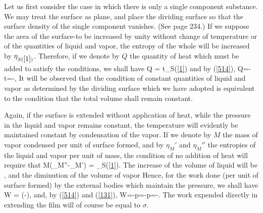 \documentclass[12pt]{article}
\begin{document}
{Let us first consider the case in which there is only a single component substance.  We may treat the surface as plane, and place the dividing surface so that the surface density of the single component vanishes. (See page 234.) If we suppose the area of the surface-to be increased by unity without change of temperature or of the quantities of liquid and vapor, the entropy of the whole will be increased by $\eta_{S(\ref{1})}$. Therefore, if we denote by $Q$ the quantity of heat which must be added to satisfy the conditions, we shall have
\eqs Q = t\eta_{S(\ref{1})}   \label{586}  \eqe
and by (\ref{514}),
\eqs Q=-t=-, \label{587} \eqe
It will be observed that the condition of constant quantities of liquid and vapor as determined by the dividing surface which we have adopted is equivalent to the condition that the total volume shall remain constant.

Again, if the surface is extended without application of heat, while the pressure in the liquid and vapor remains constant, the temperature will evidently be maintained constant by condensation of the vapor. If we denote by $M$ the mass of vapor condensed per unit of surface formed, and by $\eta_M'$ and $\eta_M''$ the entropies of the liquid and vapor per unit of mass, the condition of no addition of heat will require that
\eqs M(\eta_M''-\eta_M') = \eta_{S(\ref{1})}. \label{588} \eqe
The increase of the volume of liquid will be
\eqs {},\label{589} \eqe
and the diminution of the volume of vapor
\eqs {} \label{590} \eqe
Hence, for the work done (per unit of surface formed) by the external bodies which maintain the pressure, we shall have
\eqs W = \left(-\right), \label{591} \eqe
and, by (\ref{514}) and (\ref{131}),
\eqs W=-p=-p=-.     \label{592} \eqe
The work expended directly in extending the film will of course be equal to $\sigma$.

}
\end{document}
